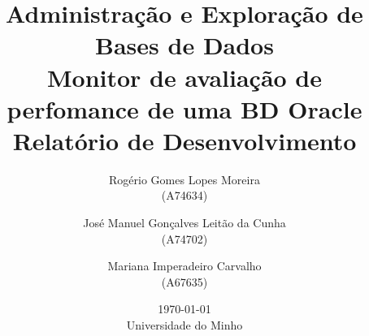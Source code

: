 \title{\Large{Administração e Exploração de Bases de Dados}\\[1cm]
\LARGE{\textbf{Monitor de avaliação de perfomance de uma BD Oracle} \\ Relatório de Desenvolvimento}}

\author{Rogério Gomes Lopes Moreira\\ (A74634)  \and José Manuel Gonçalves Leitão da Cunha\\ (A74702) \and Mariana Imperadeiro Carvalho\\ (A67635)}

\date{\today\\Universidade do Minho}


\maketitle